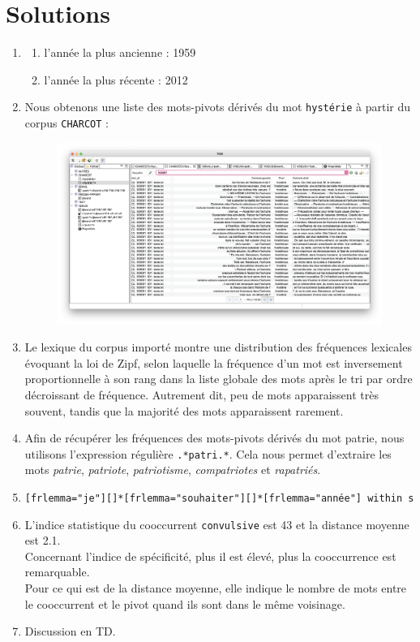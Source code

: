 \documentclass[xcolor={table,usenames,dvipsnames}]{article}
\begin{document}
\section{Solutions}
\begin{enumerate}
	\item
	\begin{enumerate}
		\item l'année la plus ancienne : 1959 
		\item l'année la plus récente : 2012
 	\end{enumerate}
 	
 	\item Nous obtenons une liste des mots-pivots dérivés du mot \texttt{hystérie} à partir du corpus \texttt{CHARCOT} :
 	\begin{figure}[h] %
 		\centering
 		\includegraphics[width=0.80\linewidth]{img/hysterie.png}
 		\label{fig:ling_out_TAL}
 	\end{figure}
 	
 	\item Le lexique du corpus importé montre une distribution des fréquences lexicales évoquant la loi de Zipf, selon laquelle la fréquence d'un mot est inversement proportionnelle à son rang dans la liste globale des mots après le tri par ordre décroissant de fréquence. Autrement dit, peu de mots apparaissent très souvent, tandis que la majorité des mots apparaissent rarement.
 	
 	\item Afin de récupérer les fréquences des mots-pivots dérivés du mot \og{}patrie\fg{}, nous utilisons l'expression régulière \texttt{.*patri.*}. Cela nous permet d'extraire les mots \textit{patrie}, \textit{patriote}, \textit{patriotisme}, \textit{compatriotes} et \textit{rapatriés}.
 	
 	\item \texttt{[frlemma="je"][]*[frlemma="souhaiter"][]*[frlemma="année"] within s}
 	\item L'indice statistique du cooccurrent \texttt{convulsive} est \textsc{43} et la distance moyenne est \textsc{2.1}.\\ Concernant l'indice de spécificité, plus il est élevé, plus
 	la cooccurrence est remarquable. \\
 	Pour ce qui est de la distance moyenne, elle indique le nombre de mots entre le cooccurrent et le pivot quand ils sont dans le même voisinage.
 	\item Discussion en \textsc{TD}.
 	
\end{enumerate}



		\printbibliography

	
\end{document}

